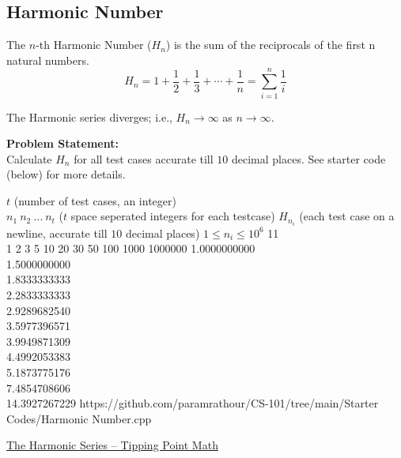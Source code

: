 \documentclass[../../Problems]{subfiles}
\begin{document}
\subsection{Harmonic Number}{\label{pp:harmonic}}
The $n$-th Harmonic Number ($H_n$) is the sum of the reciprocals of the first n natural numbers.
\begin{equation}
{H_{n}=1+{\frac {1}{2}}+{\frac {1}{3}}+\cdots +{\frac {1}{n}}=\sum _{i=1}^{n}{\frac {1}{i}}}
\end{equation}
\begin{fact}
The Harmonic series diverges; i.e., $H_n \rightarrow\infty$ as $n\rightarrow\infty$.
\end{fact}
\textbf{Problem Statement:}\\
Calculate $H_n$ for all test cases accurate till $10$ decimal places. See starter code (below) for more details.
\begin{testcases}
	{$t$ \hfill(number of test cases, an integer)\\
	$n_1\ n_2\ \ldots\ n_t$ \hfill($t$ space seperated integers for each testcase)}
	{$H_{n_i}$ \hfill(each test case on a newline, accurate till $10$ decimal places)}
	{$1 \leq n_i \leq 10^{6}$}
	{11\\1 2 3 5 10 20 30 50 100 1000 1000000}
	{1.0000000000\\1.5000000000\\1.8333333333\\2.2833333333\\2.9289682540\\3.5977396571\\3.9949871309\\4.4992053383\\5.1873775176\\7.4854708606\\14.3927267229}
	{https://github.com/paramrathour/CS-101/tree/main/Starter Codes/Harmonic Number.cpp}
\end{testcases}
\begin{funvideo}
\href{https://youtu.be/Dgcoa2yAUfw}{The Harmonic Series -- Tipping Point Math}
\end{funvideo}
\end{document}
